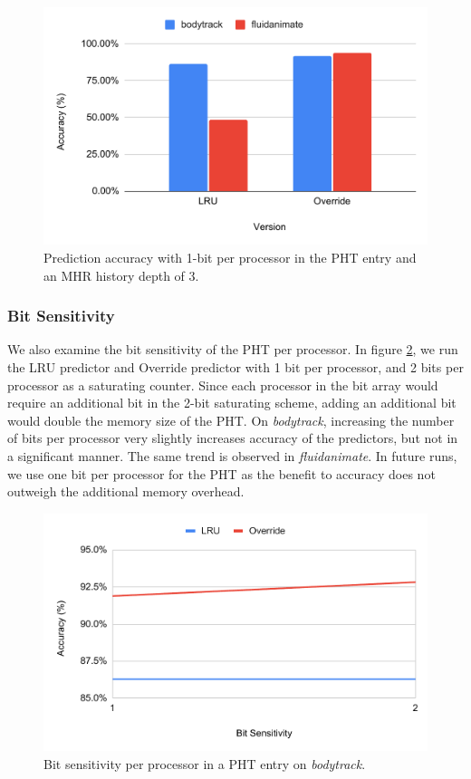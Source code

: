         \begin{figure} [h!]
            \centering
            \includegraphics[scale=0.5]{img/initial.pdf}
            \caption{Prediction accuracy with 1-bit per processor in the PHT entry and an MHR history depth of 3. }
            \label{fig:initial-results}
        \end{figure}

        \subsubsection{Bit Sensitivity}
            We also examine the bit sensitivity of the PHT per processor. In figure \ref{fig:bit-sensitivity}, we run the LRU predictor and Override predictor with 1 bit per processor, and 2 bits per processor as a saturating counter. Since each processor in the bit array would require an additional bit in the 2-bit saturating scheme, adding an additional bit would double the memory size of the PHT. On \textit{bodytrack}, increasing the number of bits per processor very slightly increases accuracy of the predictors, but not in a significant manner. The same trend is observed in \textit{fluidanimate}. In future runs, we use one bit per processor for the PHT as the benefit to accuracy does not outweigh the additional memory overhead. 
        
    
            \begin{figure}[h!]
                \centering
                \includegraphics[scale=0.5]{img/bit_sensitivity.pdf}
                \caption{Bit sensitivity per processor in a PHT entry on \textit{bodytrack}.}
                \label{fig:bit-sensitivity}
            \end{figure}

